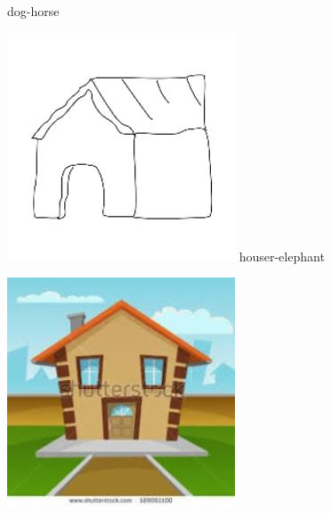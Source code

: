 \documentclass{article}
\begin{document}
\begin{center}
\begin{minipage}{0.142\textwidth}
        dog-horse
    \end{minipage}%
    \begin{minipage}{0.142\textwidth}
        \includegraphics[width=\linewidth]{./pic/misclassified_r5_p1_2723.jpg}
        houser-elephant
    \end{minipage}%
    \begin{minipage}{0.142\textwidth}
        \includegraphics[width=\linewidth]{./pic/misclassified_r5_p2_2723.jpg}

\end{minipage}
\end{center}
\end{document}
